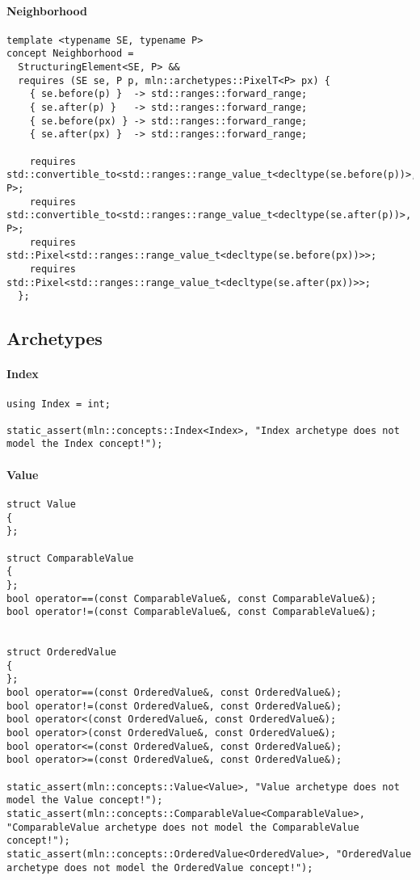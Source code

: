 \paragraph{Neighborhood}

\begin{verbatim}
template <typename SE, typename P>
concept Neighborhood =
  StructuringElement<SE, P> &&
  requires (SE se, P p, mln::archetypes::PixelT<P> px) {
    { se.before(p) }  -> std::ranges::forward_range;
    { se.after(p) }   -> std::ranges::forward_range;
    { se.before(px) } -> std::ranges::forward_range;
    { se.after(px) }  -> std::ranges::forward_range;

    requires std::convertible_to<std::ranges::range_value_t<decltype(se.before(p))>, P>;
    requires std::convertible_to<std::ranges::range_value_t<decltype(se.after(p))>, P>;
    requires std::Pixel<std::ranges::range_value_t<decltype(se.before(px))>>;
    requires std::Pixel<std::ranges::range_value_t<decltype(se.after(px))>>;
  };
\end{verbatim}


\subsection{Archetypes}

\paragraph{Index}

\begin{verbatim}
using Index = int;

static_assert(mln::concepts::Index<Index>, "Index archetype does not model the Index concept!");
\end{verbatim}


\paragraph{Value}

\begin{verbatim}
struct Value
{
};

struct ComparableValue
{
};
bool operator==(const ComparableValue&, const ComparableValue&);
bool operator!=(const ComparableValue&, const ComparableValue&);


struct OrderedValue
{
};
bool operator==(const OrderedValue&, const OrderedValue&);
bool operator!=(const OrderedValue&, const OrderedValue&);
bool operator<(const OrderedValue&, const OrderedValue&);
bool operator>(const OrderedValue&, const OrderedValue&);
bool operator<=(const OrderedValue&, const OrderedValue&);
bool operator>=(const OrderedValue&, const OrderedValue&);

static_assert(mln::concepts::Value<Value>, "Value archetype does not model the Value concept!");
static_assert(mln::concepts::ComparableValue<ComparableValue>, "ComparableValue archetype does not model the ComparableValue concept!");
static_assert(mln::concepts::OrderedValue<OrderedValue>, "OrderedValue archetype does not model the OrderedValue concept!");
\end{verbatim}


